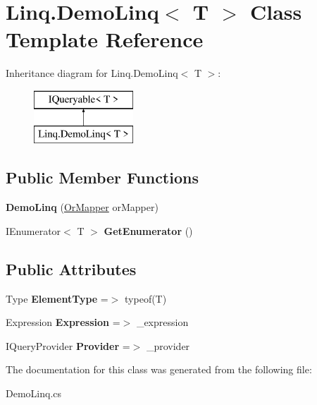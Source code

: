 \hypertarget{class_linq_1_1_demo_linq}{}\section{Linq.\+Demo\+Linq$<$ T $>$ Class Template Reference}
\label{class_linq_1_1_demo_linq}
Inheritance diagram for Linq.\+Demo\+Linq$<$ T $>$\+:\begin{figure}[H]
\begin{center}
\leavevmode
\includegraphics[height=2.000000cm]{class_linq_1_1_demo_linq}
\end{center}
\end{figure}
\subsection*{Public Member Functions}
\begin{DoxyCompactItemize}
\item 
\mbox{\label{class_linq_1_1_demo_linq_afce055a9d9b7c32436fa552dac72613f}} 
{\bfseries Demo\+Linq} (\mbox{\hyperlink{class_linq_1_1_or_mapper}{Or\+Mapper}} or\+Mapper)
\item 
\mbox{\label{class_linq_1_1_demo_linq_a5a790bccc32e67443accd68ef09750e8}} 
I\+Enumerator$<$ T $>$ {\bfseries Get\+Enumerator} ()
\end{DoxyCompactItemize}
\subsection*{Public Attributes}
\begin{DoxyCompactItemize}
\item 
\mbox{\label{class_linq_1_1_demo_linq_a1838af085c6db0ff4702aae6adebf7fa}} 
Type {\bfseries Element\+Type} =$>$ typeof(T)
\item 
\mbox{\label{class_linq_1_1_demo_linq_aa3423df7efd2291f8e5a85360fb34625}} 
Expression {\bfseries Expression} =$>$ \+\_\+expression
\item 
\mbox{\label{class_linq_1_1_demo_linq_a3efe337505d812ecd189ab8dbfcf58fc}} 
I\+Query\+Provider {\bfseries Provider} =$>$ \+\_\+provider
\end{DoxyCompactItemize}


The documentation for this class was generated from the following file\+:\begin{DoxyCompactItemize}
\item 
Demo\+Linq.\+cs\end{DoxyCompactItemize}
